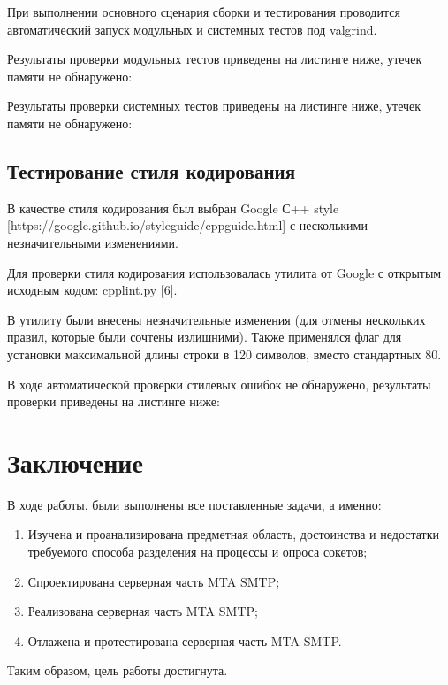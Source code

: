 \documentclass[a4paper,12pt]{report}
\begin{document}
При выполнении основного сценария сборки и тестирования проводится автоматический запуск модульных и системных тестов под valgrind. 

Результаты проверки модульных тестов приведены на листинге ниже, утечек памяти не обнаружено: 



Результаты проверки системных тестов приведены на листинге ниже, утечек памяти не обнаружено: 



\section{Тестирование стиля кодирования}

В качестве стиля кодирования был выбран Google С++ style [https://google.github.io/styleguide/cppguide.html] с несколькими незначительными изменениями. 
 
Для проверки стиля кодирования использовалась утилита от Google с открытым исходным кодом: cpplint.py [6]. 

В утилиту были внесены незначительные изменения (для отмены нескольких правил, которые были сочтены излишними). Также применялся флаг для установки максимальной длины строки в 120 символов, вместо стандартных 80.

В ходе автоматической проверки стилевых ошибок не обнаружено, результаты проверки приведены на листинге ниже: 


\clearpage
\chapter*{Заключение}

В ходе работы, были выполнены все поставленные задачи, а именно: 

\begin{enumerate}
	\item Изучена и проанализирована предметная область, достоинства и недостатки требуемого способа разделения на процессы и опроса сокетов;
	\item Спроектирована серверная часть MTA SMTP;
	\item Реализована серверная часть MTA SMTP; 
	\item Отлажена и протестирована серверная часть MTA SMTP.
\end{enumerate}

Таким образом, цель работы достигнута. 
\end{document}

